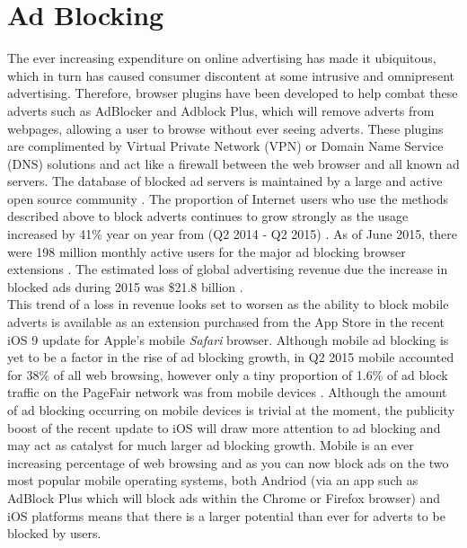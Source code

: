 \documentclass{article}
\begin{document}
\section{Ad Blocking}
The ever increasing expenditure on online advertising has made it ubiquitous, which in turn has caused consumer discontent at some intrusive and omnipresent advertising. Therefore, browser plugins have been developed to help combat these adverts such as AdBlocker and Adblock Plus, which will remove adverts from webpages, allowing a user to browse without ever seeing adverts. These plugins are complimented by Virtual Private Network (VPN) or Domain Name Service (DNS) solutions and act like a firewall between the web browser and all known ad servers. The database of blocked ad servers is maintained by a large and active open source community \parencite{adobeAdBlock}. The proportion of Internet users who use the methods described above to block adverts continues to grow strongly as the usage increased by 41\% year on year from (Q2 2014 - Q2 2015) \parencite{adobeAdBlock}. As of June 2015, there were 198 million monthly active users for the major ad blocking browser extensions \parencite{adobeAdBlock}. The estimated loss of global advertising revenue due the increase in blocked ads during 2015 was \$21.8 billion \parencite{adobeAdBlock}. \\

This trend of a loss in revenue looks set to worsen as the ability to block mobile adverts is available as an extension purchased from the App Store in the recent iOS 9 update for Apple's mobile \textit{Safari} browser. Although mobile ad blocking is yet to be a factor in the rise of ad blocking growth, in Q2 2015 mobile accounted for 38\% of all web browsing, however only a tiny proportion of 1.6\% of ad block traffic on the PageFair network was from mobile devices \parencite{adobeAdBlock}. Although the amount of ad blocking occurring on mobile devices is trivial at the moment, the publicity boost of the recent update to iOS will draw more attention to ad blocking and may act as catalyst for  much larger ad blocking growth. Mobile is an ever increasing percentage of web browsing and as you can now block ads on the two most popular mobile operating systems, both Andriod (via an app such as AdBlock Plus which will block ads within the Chrome or Firefox browser) and iOS platforms means that there is a larger potential than ever for adverts to be blocked by users. \\
\end{document}
